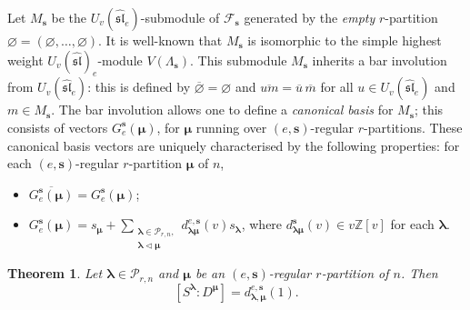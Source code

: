 \documentclass[a4paper,10pt]{amsart}
\theoremstyle{plain}
\newcommand{\bvarnothing}{{\boldsymbol \varnothing}}
\def\bs{{\boldsymbol{s}}}
\def\PP{\mathscr{P}}
\def\blam{{\boldsymbol \lambda}}
\def\bmu{{\boldsymbol \mu}}
\theoremstyle{plain}
\newtheorem{theorem}{Theorem}[section]
\numberwithin{equation}{section}
\begin{document}
Let $M_{\bs}$ be the $U_v(\widehat{\mathfrak{sl}}_e)$-submodule of $\mathcal{F}_{\bs}$ generated by the \emph{empty} $r$-partition $\bvarnothing=(\varnothing, \ldots, \varnothing)$. It is well-known that $M_{\bs}$ is isomorphic to the simple highest weight $U_v(\widehat{\mathfrak{sl}})_{e}$-module $V(\Lambda_\bs)$.  This submodule $M_{\bs}$ inherits a bar involution from $U_v(\widehat{\mathfrak{sl}}_e)$: this is defined by $\overline{\bvarnothing}=\bvarnothing$ and $\overline{um} = \overline u\,\overline m$ for all $u\in U_v(\widehat{\mathfrak{sl}}_e)$ and $m\in M_{\bs}$.  The bar involution allows one to define a \emph{canonical basis} for $M_{\bs}$; this consists of vectors $G^{\bs}_e(\bmu)$, for $\bmu$ running over $(e,\bs)$-regular $r$-partitions. These canonical basis vectors are uniquely characterised by the following properties: for each $(e,\bs)$-regular $r$-partition $\bmu$ of $n$,
\begin{itemize}
\item[(1)] $\overline{G^{\bs}_e(\bm\mu)}=G^{\bs}_e(\bm\mu)$;
\item[(2)] $G^{\bs}_e(\bmu) = s_\bmu+\sum_{\substack{\blam\in\PP_{r,n},\\ \blam\lhd\bmu}}d^{e,\bs}_{\blam\bm\mu}(v)s_\blam$, where $d^{\bs}_{\blam\bm\mu}(v)\in v\mathbb{Z}[v]$ for each $\blam$.
\end{itemize}

\begin{theorem}\label{A1} Let $\blam\in\PP_{r,n}$ and $\bmu$ be an $(e,\bs)$-regular $r$-partition of $n$. Then $$
[S^\blam:D^\bmu]=d^{e,\bs}_{\blam,\bmu}(1).
$$
\end{theorem}
\end{document}
